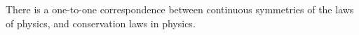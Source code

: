 There is a one-to-one correspondence between continuous symmetries of the
laws of physics, and conservation laws in physics.